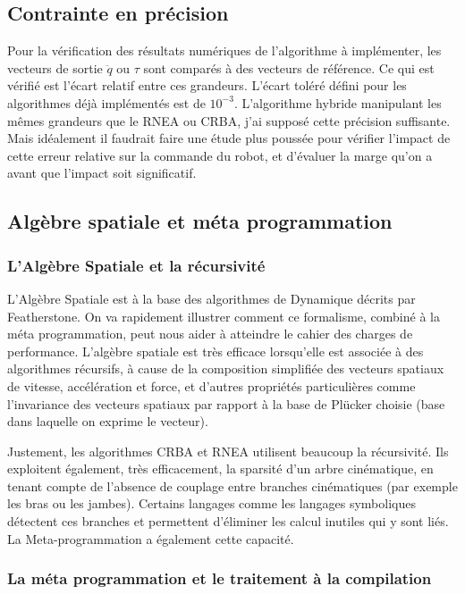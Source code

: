 \documentclass{report}
\begin{document}
\subsection{Contrainte en précision}

Pour la vérification des résultats numériques de l'algorithme à implémenter, les vecteurs de sortie $\ddot{q}$ ou $\tau$ sont comparés à des vecteurs de référence. Ce qui est vérifié est l'écart relatif entre ces grandeurs. L'écart toléré défini pour les algorithmes déjà implémentés est de $10^{-3}$. L'algorithme hybride manipulant les mêmes grandeurs que le RNEA ou CRBA, j'ai supposé cette précision suffisante. Mais idéalement il faudrait faire une étude plus poussée pour vérifier l'impact de cette erreur relative sur la commande du robot, et d'évaluer la marge qu'on a avant que l'impact soit significatif.


\subsection{Algèbre spatiale et méta programmation}

\subsubsection*{L'Algèbre Spatiale et la récursivité}

L'Algèbre Spatiale est à la base des algorithmes de Dynamique décrits par Featherstone. On va rapidement illustrer comment ce formalisme, combiné à la méta programmation, peut nous aider à atteindre le cahier des charges de performance. L'algèbre spatiale est très efficace lorsqu'elle est associée à des algorithmes récursifs, à cause de la composition simplifiée des vecteurs spatiaux de vitesse, accélération et force, et d'autres propriétés particulières comme l'invariance des vecteurs spatiaux par rapport à la base de Plücker choisie (base dans laquelle on exprime le vecteur).

Justement, les algorithmes CRBA et RNEA utilisent beaucoup la récursivité. Ils exploitent également, très efficacement, la sparsité d'un arbre cinématique, en tenant compte de l'absence de couplage entre branches cinématiques (par exemple les bras ou les jambes). Certains langages comme les langages symboliques détectent ces branches et permettent d'éliminer les calcul inutiles qui y sont liés. La Meta-programmation a également cette capacité.

\subsubsection*{La méta programmation et le traitement à la compilation}
\end{document}
